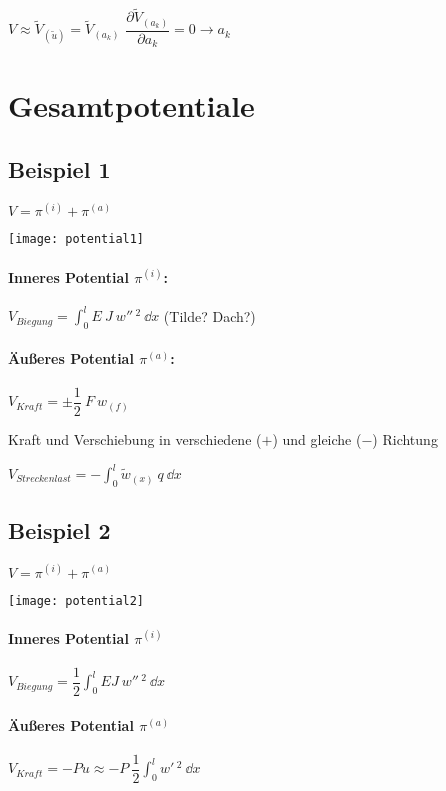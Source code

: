 	$ V \approx \tilde{V}_{(\tilde{u})} = \tilde{V}_{(a_k)} $
		\qquad $ \dfrac{\partial \tilde{V}_{(a_k)}}{\partial a_k} = 0 \rightarrow a_k $
		
\clearpage
\section{Gesamtpotentiale}
\subsection{Beispiel 1}

	$ V = \pi^{(i)} + \pi^{(a)} $
	
	\texttt{[image: potential1]}
	
	
\paragraph{ Inneres Potential $ \pi^{(i)} $:}
	\qquad $ V_{Biegung} = \displaystyle\int_{0}^{l} E\ J\ w''\,^2 \ \dd x $  (Tilde? Dach?)
	
\paragraph{ Äußeres Potential $ \pi^{(a)} $:}
	\qquad $ V_{Kraft} = \pm \dfrac{1}{2}\ F\ w_{(f)} $
	
	Kraft und Verschiebung in verschiedene ($ + $) und gleiche ($ - $) Richtung
	
	$ V_{Streckenlast} = -\displaystyle\int_{0}^{l} \tilde{w}_{(x)}\ q\ \dd x $
	
\subsection{Beispiel 2}

	$ V = \pi^{(i)} + \pi^{(a)} $
	
	\texttt{[image: potential2]}
	
\paragraph{ Inneres Potential $ \pi^{(i)} $}
	\qquad $ V_{Biegung}= \dfrac{1}{2} \displaystyle \int_{0}^{l} E J\ w''\, ^2 \ \dd x $
	
\paragraph{ Äußeres Potential $ \pi^{(a)} $}
	\qquad $ V_{Kraft}  = - P u\approx - P\ \dfrac{1}{2}\displaystyle \int_{0}^{l} w'\, ^2 \ \dd x $
	
